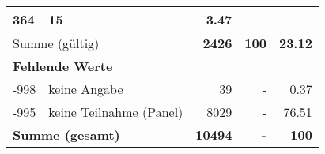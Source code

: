 \begin{longtable}{lXrrr}
       \num{364} &
       \num[round-mode=places,round-precision=2]{15} &
         \num[round-mode=places,round-precision=2]{3,47} \\
     \midrule
     \multicolumn{2}{l}{Summe (gültig)} &
       \textbf{\num{2426}} &
     \textbf{100} &
       \textbf{\num[round-mode=places,round-precision=2]{23,12}} \\
     \multicolumn{5}{l}{\textbf{Fehlende Werte}}\\
       -998 &
       keine Angabe &
         \num{39} &
        - &
         \num[round-mode=places,round-precision=2]{0,37} \\
       -995 &
       keine Teilnahme (Panel) &
         \num{8029} &
        - &
         \num[round-mode=places,round-precision=2]{76,51} \\
     \midrule
     \multicolumn{2}{l}{\textbf{Summe (gesamt)}} &
          \textbf{\num{10494}} &
        \textbf{-} &
        \textbf{100} \\
     \bottomrule
     \end{longtable}
     
